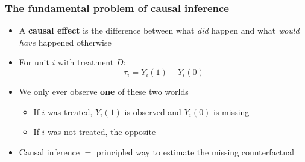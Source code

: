 \begin{frame}
\frametitle{The fundamental problem of causal inference}
\centering

\begin{itemize}[<+->]
\item A \textbf{causal effect} is the difference between what \textit{did} happen and what \textit{would have} happened otherwise
\vspace{6pt}
\item For unit $i$ with treatment $D$:
  \[
    \tau_i = Y_i(1) - Y_i(0)
  \]
\vspace{-6pt}
\item We only ever observe \textbf{one} of these two worlds
  \begin{itemize}
  \item If $i$ was treated, $Y_i(1)$ is observed and $Y_i(0)$ is missing
  \item If $i$ was not treated, the opposite
  \end{itemize}
\vspace{6pt}
\item Causal inference $=$ principled way to estimate the missing counterfactual
\end{itemize}

\end{frame}

